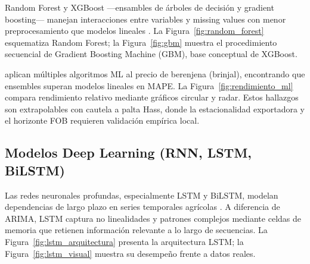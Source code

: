 
Random Forest y XGBoost ---ensambles de \'arboles de decisi\'on y gradient boosting--- manejan interacciones entre variables y missing values con menor preprocesamiento que modelos lineales \citep{Paul2022}. La Figura~\ref{fig:random_forest} esquematiza Random Forest; la Figura~\ref{fig:gbm} muestra el procedimiento secuencial de Gradient Boosting Machine (GBM), base conceptual de XGBoost.



\citet{Paul2022} aplican m\'ultiples algoritmos ML al precio de berenjena (brinjal), encontrando que ensembles superan modelos lineales en MAPE. La Figura~\ref{fig:rendimiento_ml} compara rendimiento relativo mediante gr\'aficos circular y radar. Estos hallazgos son extrapolables con cautela a palta Hass, donde la estacionalidad exportadora y el horizonte FOB requieren validaci\'on emp\'irica local.


\subsection{Modelos Deep Learning (RNN, LSTM, BiLSTM)}

Las redes neuronales profundas, especialmente LSTM y BiLSTM, modelan dependencias de largo plazo en series temporales agr\'icolas \citep{Murugesan2022, Chen2023, Zhang2025}. A diferencia de ARIMA, LSTM captura no linealidades y patrones complejos mediante celdas de memoria que retienen informaci\'on relevante a lo largo de secuencias. La Figura~\ref{fig:lstm_arquitectura} presenta la arquitectura LSTM; la Figura~\ref{fig:lstm_visual} muestra su desempe\~no frente a datos reales.




